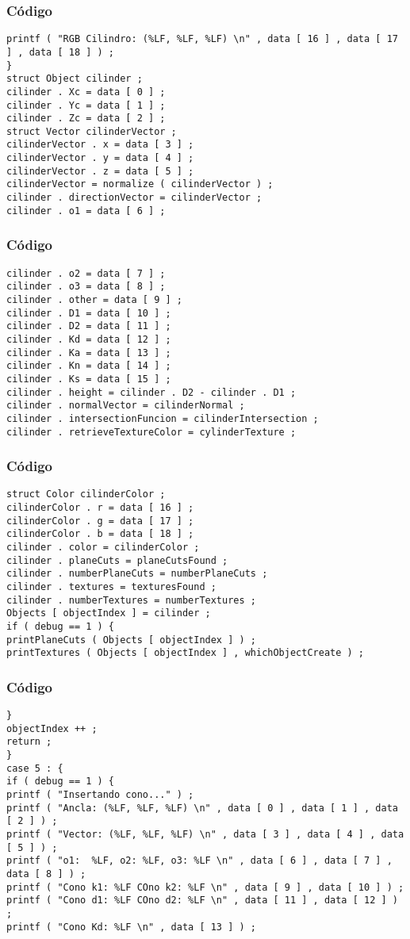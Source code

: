 \documentclass{beamer}
\begin{document}
\begin{frame}[fragile]
\frametitle{C\'odigo}
\begin{verbatim}
printf ( "RGB Cilindro: (%LF, %LF, %LF) \n" , data [ 16 ] , data [ 17 ] , data [ 18 ] ) ; 
} 
struct Object cilinder ; 
cilinder . Xc = data [ 0 ] ; 
cilinder . Yc = data [ 1 ] ; 
cilinder . Zc = data [ 2 ] ; 
struct Vector cilinderVector ; 
cilinderVector . x = data [ 3 ] ; 
cilinderVector . y = data [ 4 ] ; 
cilinderVector . z = data [ 5 ] ; 
cilinderVector = normalize ( cilinderVector ) ; 
cilinder . directionVector = cilinderVector ; 
cilinder . o1 = data [ 6 ] ; 
\end{verbatim}
\end{frame}
\begin{frame}[fragile]
\frametitle{C\'odigo}
\begin{verbatim}
cilinder . o2 = data [ 7 ] ; 
cilinder . o3 = data [ 8 ] ; 
cilinder . other = data [ 9 ] ; 
cilinder . D1 = data [ 10 ] ; 
cilinder . D2 = data [ 11 ] ; 
cilinder . Kd = data [ 12 ] ; 
cilinder . Ka = data [ 13 ] ; 
cilinder . Kn = data [ 14 ] ; 
cilinder . Ks = data [ 15 ] ; 
cilinder . height = cilinder . D2 - cilinder . D1 ; 
cilinder . normalVector = cilinderNormal ; 
cilinder . intersectionFuncion = cilinderIntersection ; 
cilinder . retrieveTextureColor = cylinderTexture ; 
\end{verbatim}
\end{frame}
\begin{frame}[fragile]
\frametitle{C\'odigo}
\begin{verbatim}
struct Color cilinderColor ; 
cilinderColor . r = data [ 16 ] ; 
cilinderColor . g = data [ 17 ] ; 
cilinderColor . b = data [ 18 ] ; 
cilinder . color = cilinderColor ; 
cilinder . planeCuts = planeCutsFound ; 
cilinder . numberPlaneCuts = numberPlaneCuts ; 
cilinder . textures = texturesFound ; 
cilinder . numberTextures = numberTextures ; 
Objects [ objectIndex ] = cilinder ; 
if ( debug == 1 ) { 
printPlaneCuts ( Objects [ objectIndex ] ) ; 
printTextures ( Objects [ objectIndex ] , whichObjectCreate ) ; 
\end{verbatim}
\end{frame}
\begin{frame}[fragile]
\frametitle{C\'odigo}
\begin{verbatim}
} 
objectIndex ++ ; 
return ; 
} 
case 5 : { 
if ( debug == 1 ) { 
printf ( "Insertando cono..." ) ; 
printf ( "Ancla: (%LF, %LF, %LF) \n" , data [ 0 ] , data [ 1 ] , data [ 2 ] ) ; 
printf ( "Vector: (%LF, %LF, %LF) \n" , data [ 3 ] , data [ 4 ] , data [ 5 ] ) ; 
printf ( "o1:  %LF, o2: %LF, o3: %LF \n" , data [ 6 ] , data [ 7 ] , data [ 8 ] ) ; 
printf ( "Cono k1: %LF COno k2: %LF \n" , data [ 9 ] , data [ 10 ] ) ; 
printf ( "Cono d1: %LF COno d2: %LF \n" , data [ 11 ] , data [ 12 ] ) ; 
printf ( "Cono Kd: %LF \n" , data [ 13 ] ) ; 
\end{verbatim}
\end{frame}
\end{document}
